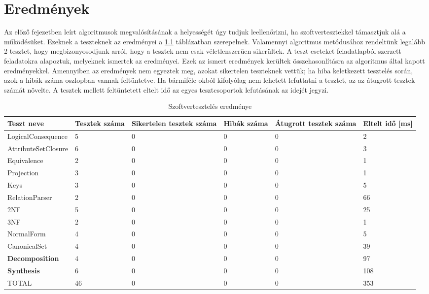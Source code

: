 \chapter{Eredmények}

Az előző fejezetben leírt algoritmusok megvalósításának a helyességét úgy tudjuk leellenőrizni, ha szoftvertesztekkel támasztjuk alá a működésüket. Ezeknek a teszteknek az eredményei a \ref{tab:teszt} táblázatban szerepelnek. Valamennyi algoritmus metódusához rendeltünk legalább 2 tesztet, hogy megbizonyosodjunk arról, hogy a tesztek nem csak véletlenszerűen sikerültek. A teszt eseteket feladatlapból \parencite{kordic2018} szerzett feladatokra alapoztuk, melyeknek ismertek az eredményei. Ezek az ismert eredmények kerültek összehasonlításra az algoritmus által kapott eredményekkel. Amennyiben az eredmények nem egyeztek meg, azokat sikertelen teszteknek vettük; ha hiba keletkezett tesztelés során, azok a hibák száma oszlopban vannak feltüntetve. Ha bármiféle okból kifolyólag nem lehetett lefuttatni a tesztet, az az átugrott tesztek számát növelte. A tesztek mellett feltüntetett eltelt idő az egyes tesztcsoportok lefutásának az idejét jegyzi.

\begin{table}
    \centering
    \begin{tabular}{|b{4cm}|b{1.5cm}|b{1.8cm}|b{1.5cm}|b{1.5cm}|b{1.5cm}|}
    \hline
    Teszt neve & Tesztek száma & Sikertelen tesztek száma & Hibák száma & Átugrott tesztek száma & Eltelt idő [ms] \\
    \hline \hline
    LogicalConsequence & 5 & 0 & 0 & 0 & 2 \\ \hline
    AttributeSetClosure & 6 & 0 & 0 & 0 & 3 \\ \hline
    Equivalence & 2 & 0 & 0 & 0 & 1 \\ \hline
    Projection & 3 & 0 & 0 & 0 & 1 \\ \hline
    Keys & 3 & 0 & 0 & 0 & 5 \\ \hline
    RelationParser & 2 & 0 & 0 & 0 & 66 \\ \hline
    2NF & 5 & 0 & 0 & 0 & 25 \\ \hline
    3NF & 2 & 0 & 0 & 0 & 1 \\ \hline
    NormalForm & 4 & 0 & 0 & 0 & 5 \\ \hline
    CanonicalSet & 4 & 0 & 0 & 0 & 39 \\ \hline
    \textbf{Decomposition} & 4 & 0 & 0 & 0 & 97 \\ \hline
    \textbf{Synthesis} & 6 & 0 & 0 & 0 & 108 \\ \hline
    \hline
    TOTAL & 46 & 0 & 0 & 0 & 353 \\ \hline
    \end{tabular}
    \caption{Szoftvertesztelés eredménye}
    \label{tab:teszt}
\end{table}

